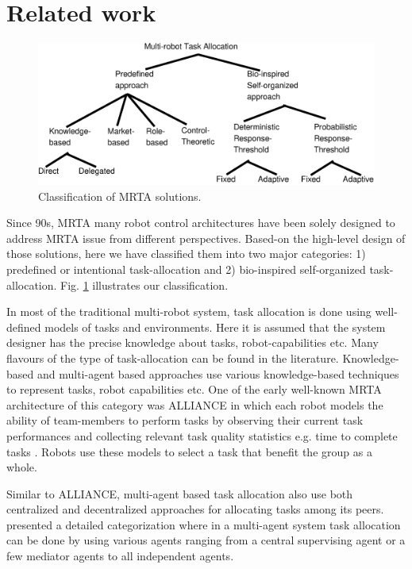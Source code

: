 \documentclass[final,5p,times,twocolumn]{elsarticle}
\begin{document}
\section{Related work}
\label{sec:bg}
\begin{figure}
\centering
\includegraphics[width=0.7\linewidth, angle=0]
{./images/ta-categories.eps}
\caption{Classification of MRTA solutions.}
\label{fig:mrta-classification} %
\end{figure}
Since 90s, MRTA many robot control architectures   have been solely designed to address MRTA issue from different perspectives. Based-on the high-level design of those solutions, here we have classified them into two major categories: 1) predefined or intentional task-allocation and 2) bio-inspired self-organized task-allocation. Fig. \ref{fig:mrta-classification} illustrates our classification.

In most of the traditional multi-robot system, task allocation is done using well-defined models of tasks and environments. Here it is assumed that the system designer has the precise knowledge about tasks, robot-capabilities etc. Many flavours of the type of task-allocation can be found in the literature. Knowledge-based and multi-agent based approaches use various knowledge-based techniques to represent tasks, robot capabilities etc. One of the early well-known MRTA architecture of this category was ALLIANCE  in which each robot models the ability of team-members to perform tasks by observing their current task performances and collecting relevant task quality statistics e.g. time to complete tasks \cite{Parker1998}. Robots use these models to select a task that benefit  the group as a whole. 

Similar to  ALLIANCE, multi-agent based task allocation also  use both centralized and decentralized approaches for allocating tasks among  its  peers. \citet{Shen+2001} presented a detailed categorization where in a multi-agent system task allocation can be done by using various agents ranging from a central supervising agent or a few mediator agents to  all independent agents. 
\end{document}
